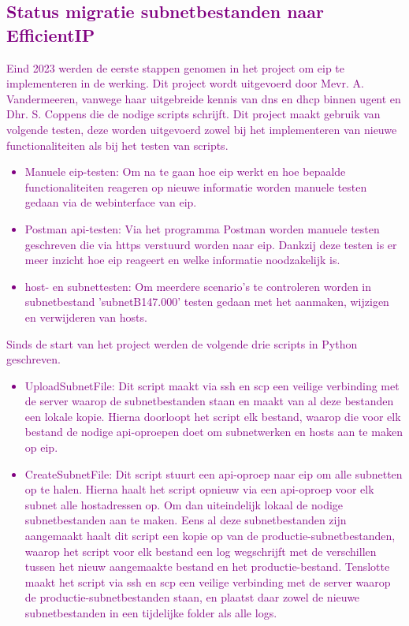\textcolor{purple}{
\section{Status migratie subnetbestanden naar EfficientIP}
Eind 2023 werden de eerste stappen genomen in het project om \acrshort{eip} te implementeren in de werking. Dit project wordt uitgevoerd door Mevr. A. Vandermeeren, vanwege haar uitgebreide kennis van \acrshort{dns} en \acrshort{dhcp} binnen \acrshort{ugent} en Dhr. S. Coppens die de nodige scripts schrijft.
Dit project maakt gebruik van volgende testen, deze worden uitgevoerd zowel bij het implementeren van nieuwe functionaliteiten als bij het testen van scripts.
\begin{itemize}
    \item Manuele \acrshort{eip}-testen: Om na te gaan hoe \acrshort{eip} werkt en hoe bepaalde functionaliteiten reageren op nieuwe informatie worden manuele testen gedaan via de webinterface van \acrshort{eip}.
    \item Postman \acrshort{api}-testen: Via het programma Postman worden manuele testen geschreven die via \acrshort{https} verstuurd worden naar \acrshort{eip}. Dankzij deze testen is er meer inzicht hoe \acrshort{eip} reageert en welke informatie noodzakelijk is.
    \item host- en subnettesten: Om meerdere scenario's te controleren worden in subnetbestand 'subnetB147.000' testen gedaan met het aanmaken, wijzigen en verwijderen van hosts.
\end{itemize}
Sinds de start van het project werden de volgende drie scripts in Python geschreven.
\begin{itemize}
    \item UploadSubnetFile: Dit script maakt via \acrshort{ssh} en \acrshort{scp} een veilige verbinding met de server waarop de subnetbestanden staan en maakt van al deze bestanden een lokale kopie. Hierna doorloopt het script elk bestand, waarop die voor elk bestand de nodige \acrshort{api}-oproepen doet om subnetwerken en hosts aan te maken op \acrshort{eip}.
    \item CreateSubnetFile: Dit script stuurt een \acrshort{api}-oproep naar \acrshort{eip} om alle subnetten op te halen. Hierna haalt het script opnieuw via een \acrshort{api}-oproep voor elk subnet alle hostadressen op. Om dan uiteindelijk lokaal de nodige subnetbestanden aan te maken. Eens al deze subnetbestanden zijn aangemaakt haalt dit script een kopie op van de productie-subnetbestanden, waarop het script voor elk bestand een log wegschrijft met de verschillen tussen het nieuw aangemaakte bestand en het productie-bestand. Tenslotte maakt het script via \acrshort{ssh} en \acrshort{scp} een veilige verbinding met de server waarop de productie-subnetbestanden staan, en plaatst daar zowel de nieuwe subnetbestanden in een tijdelijke folder als alle logs.

\end{itemize}}
